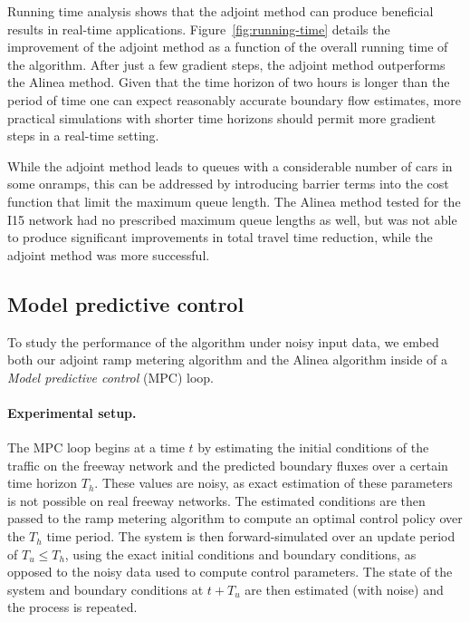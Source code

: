 																
								Running time analysis shows that the adjoint method can produce beneficial
								results in real-time applications. Figure~\ref{fig:running-time} details the improvement of the adjoint method as a function of the overall running time of the algorithm. After just a few gradient steps, the
								adjoint method outperforms the Alinea method. Given that the time
								horizon of two hours is longer than the period of time one can expect
								reasonably accurate boundary flow estimates, more practical simulations
								with shorter time horizons should permit more gradient steps in a
								real-time setting.
																
								While the adjoint method leads to queues with a considerable number of cars in some onramps, this can be addressed by introducing barrier terms into the cost function that limit the
								maximum queue length. The Alinea method tested for the I15 network
								had no prescribed maximum queue lengths as well, but was not able
								to produce significant improvements in total travel time reduction, while the adjoint method was
								more successful.
																
																
								\subsection{Model predictive control\label{sub:Model-predictive-control}}
																
								To study the performance of the algorithm under noisy input data,
								we embed both our adjoint ramp metering algorithm and the Alinea algorithm
								inside of a \emph{Model predictive control }(MPC) loop.
																
																
								\paragraph{Experimental setup.}
																
								The MPC loop begins at a time $t$ by estimating the initial conditions
								of the traffic on the freeway network and the predicted boundary fluxes
								over a certain time horizon $T_{h}$. These values are noisy, as exact
								estimation of these parameters is not possible on real freeway networks.
								The estimated conditions are then passed to the ramp metering algorithm
								to compute an optimal control policy over the $T_{h}$ time period.
								The system is then forward-simulated over an update period of $T_{u}\le T_{h}$,
								using the exact initial conditions and boundary conditions, as opposed
								to the noisy data used to compute control parameters. The state of
								the system and boundary conditions at $t+T_{u}$ are then estimated
								(with noise) and the process is repeated.
																
